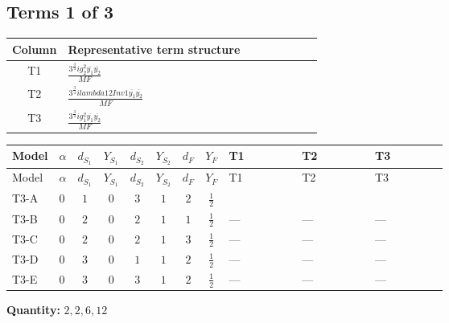 \documentclass[8pt]{article}
\begin{document}
\begin{landscape}
\subsection*{Terms 1 of 3}
\begin{center}
\begin{tabular}{@{}c >{\raggedright\arraybackslash}p{0.82\linewidth}@{}}
\toprule
Column & Representative term structure \\
\midrule
T1 & \(\displaystyle \frac{3^{\frac{3}{4}} i g_{2}^{2} \overline{y_{1}} \overline{y_{2}}}{MF}\) \\
\midrule
T2 & \(\displaystyle \frac{3^{\frac{3}{4}} i lambda12Inv1 \overline{y_{1}} \overline{y_{2}}}{MF}\) \\
\midrule
T3 & \(\displaystyle \frac{3^{\frac{3}{4}} i g_{1}^{2} \overline{y_{1}} \overline{y_{2}}}{MF}\) \\
\midrule
\bottomrule
\end{tabular}
\end{center}
\smallskip
\tiny
\begin{longtable}{@{}llcccccc >{\raggedright\arraybackslash}p{0.21\linewidth} >{\raggedright\arraybackslash}p{0.21\linewidth} >{\raggedright\arraybackslash}p{0.21\linewidth}@{}}
\toprule
Model & $\alpha$ & $d_{S_1}$ & $Y_{S_1}$ & $d_{S_2}$ & $Y_{S_2}$ & $d_F$ & $Y_F$ & T1 & T2 & T3 \\
\midrule
\endfirsthead
\toprule
Model & $\alpha$ & $d_{S_1}$ & $Y_{S_1}$ & $d_{S_2}$ & $Y_{S_2}$ & $d_F$ & $Y_F$ & T1 & T2 & T3 \\
\midrule
\endhead
T3-A & $0$ & $1$ & $0$ & $3$ & $1$ & $2$ & $\frac{1}{2}$ & \scriptsize\adjustbox{max width=\linewidth}{$\begin{gathered} - \frac{11 \cdot 3^{\frac{3}{4}} i g_{2}^{2} \overline{y_{1}} \overline{y_{2}}}{8 MF}\end{gathered}$} & \scriptsize\adjustbox{max width=\linewidth}{$\begin{gathered} - \frac{3^{\frac{3}{4}} i lambda12Inv1 \overline{y_{1}} \overline{y_{2}}}{6 MF}\end{gathered}$} & \scriptsize\adjustbox{max width=\linewidth}{$\begin{gathered} - \frac{3^{\frac{3}{4}} i g_{1}^{2} \overline{y_{1}} \overline{y_{2}}}{8 MF}\end{gathered}$} \\
\midrule
T3-B & $0$ & $2$ & $0$ & $2$ & $1$ & $1$ & $\frac{1}{2}$ & --- & --- & --- \\
\midrule
T3-C & $0$ & $2$ & $0$ & $2$ & $1$ & $3$ & $\frac{1}{2}$ & --- & --- & --- \\
\midrule
T3-D & $0$ & $3$ & $0$ & $1$ & $1$ & $2$ & $\frac{1}{2}$ & --- & --- & --- \\
\midrule
T3-E & $0$ & $3$ & $0$ & $3$ & $1$ & $2$ & $\frac{1}{2}$ & --- & --- & --- \\
\midrule
\bottomrule
\end{longtable}
\clearpage
\noindent\textbf{Quantity: }$\mathrm{2,2,6,12}$\par\smallskip

\end{landscape}
\end{document}

